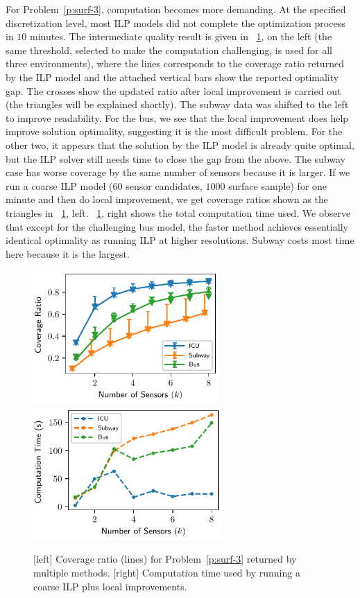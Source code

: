 For Problem~\ref{p:surf-3}, computation becomes more demanding. At the specified 
discretization level, most ILP models did not complete the optimization process 
in $10$ minutes. The intermediate quality result is given in ~\ref{fig:surf-computation-time-3}, on the left (the same threshold, selected to make the computation challenging, is used for all three environments), where the lines 
corresponds to the coverage ratio returned by the ILP model and the attached vertical bars show the reported optimality gap. The crosses show the updated ratio after local improvement is carried out (the triangles will be explained shortly). 
The subway data was shifted to the left to improve readability.
For the bus, we see that the local improvement does help improve solution optimality, suggesting it is the most difficult problem. For the other two, it appears that the solution by the ILP model is already quite optimal, but the ILP solver still needs time to close the gap from the above. The subway case has worse coverage by the same number of sensors because it is larger. If we run a coarse ILP model ($60$ sensor candidates, $1000$ surface sample) for one minute and then do local improvement, we get coverage ratios shown as the triangles in ~\ref{fig:surf-computation-time-3}, left. ~\ref{fig:surf-computation-time-3}, right shows the total computation time used. We observe that except for the challenging bus model, the faster method achieves essentially identical optimality as running ILP at higher resolutions. Subway costs most time here because it is the largest. 

\begin{figure}[!ht]
    \centering
    \includegraphics[width=.48\columnwidth, height=2in]{chapters/surf/fig/result-coverage-ratio-3-eps-converted-to.pdf}
    \includegraphics[width=.48\columnwidth, height=2in]{chapters/surf/fig/result-time-3-coarse-eps-converted-to.pdf}
    \caption[Computation time for Problem~\ref{p:surf-3}]{[left] Coverage ratio (lines) for Problem~\ref{p:surf-3} returned by multiple methods. [right] Computation time used by running a coarse ILP plus local improvements.}
    \label{fig:surf-computation-time-3}
\end{figure}

